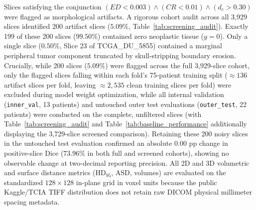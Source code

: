 \documentclass[11pt,a4paper]{article}
\begin{document}
Slices satisfying the conjunction $(ED < 0.003) \land (CR < 0.01) \land (d_c > 0.30)$ were flagged as morphological artifacts. A rigorous cohort audit across all 3,929 slices identified 200 artifact slices ($5.09\%$, Table~\ref{tab:screening_audit}). Exactly 199 of these 200 slices ($99.50\%$) contained zero neoplastic tissue ($y = 0$). Only a single slice ($0.50\%$, Slice 23 of TCGA\_DU\_5855) contained a marginal peripheral tumor component truncated by skull-stripping boundary erosion. Crucially, while 200 slices ($5.09\%$) were flagged across the full 3,929-slice cohort, only the flagged slices falling within each fold's 75-patient training split ($\approx 136$ artifact slices per fold, leaving $\approx 2,535$ clean training slices per fold) were excluded during model weight optimization, while all internal validation (\texttt{inner\_val}, 13 patients) and untouched outer test evaluations (\texttt{outer\_test}, 22 patients) were conducted on the complete, unfiltered slices (with Table~\ref{tab:screening_audit} and Table~\ref{tab:baseline_performance} additionally displaying the 3,729-slice screened comparison). Retaining these 200 noisy slices in the untouched test evaluation confirmed an absolute $0.00\text{ pp}$ change in positive-slice Dice ($73.96\%$ in both full and screened cohorts), showing no observable change at two-decimal reporting precision. All 2D and 3D volumetric and surface distance metrics ($\text{HD}_{95}$, $\text{ASD}$, volumes) are evaluated on the standardized $128 \times 128$ in-plane grid in voxel units because the public Kaggle/TCIA TIFF distribution does not retain raw DICOM physical millimeter spacing metadata.
\end{document}
